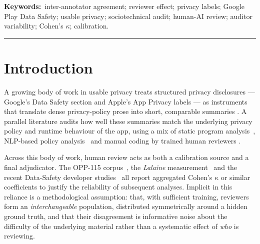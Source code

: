 \documentclass[11pt,a4paper]{article}
\begin{document}
\noindent\textbf{Keywords:}\ inter-annotator agreement; reviewer effect;
privacy labels; Google Play Data Safety; usable privacy; sociotechnical
audit; human-AI review; auditor variability; Cohen's $\kappa$;
calibration.

\bigskip\hrule\bigskip

\section{Introduction}
\label{sec:intro}

A growing body of work in usable privacy treats structured privacy
disclosures --- Google's Data Safety section and Apple's App Privacy
labels --- as instruments that translate dense privacy-policy prose into
short, comparable summaries
\citep{kelley2009nutrition,kelley2010standardizing,googledatasafety2022,
appleprivacylabels2020,khandelwal2024unpacking}. A parallel literature
audits how well these summaries match the underlying privacy policy and
runtime behaviour of the app, using a mix of static program
analysis~\citep{slavin2016toward,andow2019policylint,andow2020policheck},
NLP-based policy analysis~\citep{harkous2018polisis,zimmeck2019maps,
zimmeck2017automated,wilson2016creation,sathyendra2017identifying} and
manual coding by trained human reviewers
\citep{xiao2023lalaine,khandelwal2024unpacking,li2022understanding,
khandelwal2023comparing}.

Across this body of work, human review acts as both a calibration source
and a final adjudicator. The OPP-115
corpus~\citep{wilson2016creation}, the
\emph{Lalaine} measurement~\citep{xiao2023lalaine} and the recent
Data-Safety developer studies~\citep{li2022understanding,
khandelwal2024unpacking} all report aggregated Cohen's $\kappa$ or
similar coefficients to justify the reliability of subsequent analyses.
Implicit in this reliance is a methodological assumption: that, with
sufficient training, reviewers form an \emph{interchangeable}
population, distributed symmetrically around a hidden ground truth, and
that their disagreement is informative noise about the difficulty of
the underlying material rather than a systematic effect of \emph{who}
is reviewing.
\end{document}

